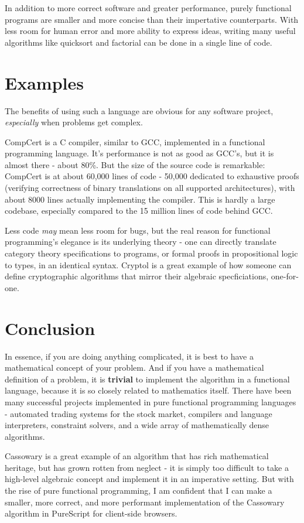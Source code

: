 \documentclass[11pt,pressrelease]{newlfm} %
\begin{document}
\begin{newlfm}
\begin{singlespace}
In addition to more correct software and greater performance, purely functional programs
are smaller and more concise than their impertative counterparts. With less room for human error
and more ability to express ideas, writing many useful algorithms like quicksort and
factorial can be done in a single line of code.

\section{Examples}

The benefits of using such a language are obvious for any software project, \textit{especially}
when problems get complex.

CompCert is a C compiler, similar to GCC, implemented in a functional programming language.
It's performance is not as good as GCC's, but it is almost there - about 80\%.
But the size of the source code is remarkable:
CompCert is at about 60,000 lines of code - 50,000 dedicated to exhaustive proofs (verifying
correctness of binary translations on all supported architectures), with about 8000 lines
actually implementing the compiler. This is hardly a large codebase, especially compared
to the 15 million lines of code behind GCC.

Less code \textit{may} mean less room for bugs, but the real reason for functional programming's
elegance is its underlying theory - one can directly translate category theory specifications to programs, or
formal proofs in propositional logic to types, in an identical syntax. Cryptol is a great
example of how someone can define cryptographic algorithms that mirror their algebraic specficiations,
one-for-one.

\section{Conclusion}

In essence, if you are doing anything complicated, it is best to have a mathematical concept of
your problem. And if you have a mathematical definition of a problem, it is \textbf{trivial} to
implement the algorithm in a functional language, because it is so closely related to
mathematics itself. There have been many successful projects implemented in pure functional
programming languages - automated trading systems for the stock market, compilers and language
interpreters, constraint solvers, and a wide array of mathematically dense algorithms.

Cassowary is a great example of an algorithm that has rich mathematical heritage, but has
grown rotten from neglect - it is simply too difficult to take a high-level algebraic concept
and implement it in an imperative setting. But with the rise of pure functional programming,
I am confident that I can make a smaller, more correct, and more performant implementation of the
Cassowary algorithm in PureScript for client-side browsers.


\end{singlespace}
\end{newlfm}
\end{document}
